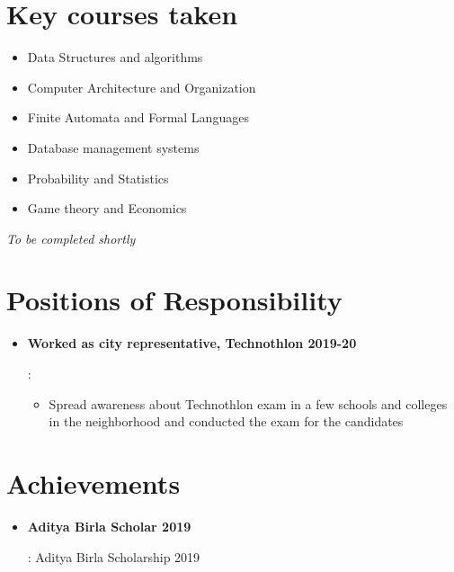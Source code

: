\documentclass[a4paper,10pt]{report}
\newcommand{\resumeItem}[2]{
  \item\small{
    \textbf{#1}{: #2 \vspace{-2pt}}
  }
}
\newcommand{\resumeSubItem}[2]{\resumeItem{#1}{#2}\vspace{-4pt}}
\newcommand{\resumeSubHeadingListStart}{\begin{itemize}[leftmargin=*]}
\newcommand{\resumeSubHeadingListEnd}{\end{itemize}}
\begin{document}
 \section{Key courses taken}
\vspace{-2pt}
 \begin{multicols}{2}
 \begin{itemize}[leftmargin = *,itemsep=-3pt]

\item Data Structures and algorithms
\item Computer Architecture and Organization
\item Finite Automata and Formal Languages
\item Database management systems
\item Probability and Statistics
\item Game theory and Economics

 \end{itemize}
 \end{multicols}
 \hfill * \textit{To be completed shortly}
 
 
 \vspace{4pt}


\section{Positions of Responsibility}
\resumeSubHeadingListStart

\resumeSubItem{Worked as city representative, Technothlon 2019-20}
{\vspace{-7pt}
\begin{itemize}
\item Spread awareness about Technothlon exam in a few schools and colleges in the neighborhood and conducted the exam for the candidates


\end{itemize} }


\vspace{-2pt}
\resumeSubHeadingListEnd


\vspace{4pt}


\section{Achievements}
\resumeSubHeadingListStart
  
\resumeSubItem{Aditya Birla Scholar 2019}{Aditya Birla Scholarship 2019

}

\resumeSubHeadingListEnd
\end{document}
